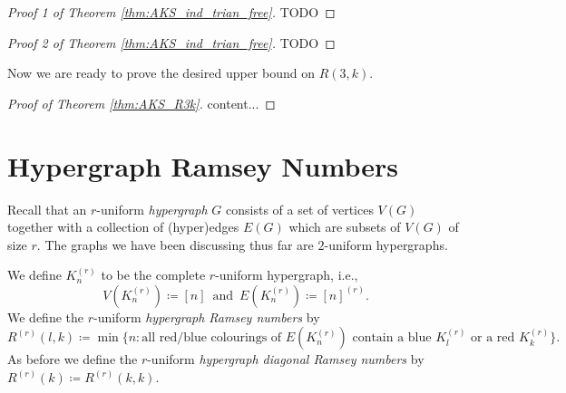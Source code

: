 \documentclass{report}
\theoremstyle{definition}
\theoremstyle{plain}
\theoremstyle{definition}
\begin{document}
	\begin{proof}[Proof 1 of Theorem \ref{thm:AKS_ind_trian_free}]
		{\color{red}TODO}
	\end{proof}
	\begin{proof}[Proof 2 of Theorem \ref{thm:AKS_ind_trian_free}]
		{\color{red}TODO}
	\end{proof}
	Now we are ready to prove the desired upper bound on $R(3,k)$.
	\begin{proof}[Proof of Theorem \ref{thm:AKS_R3k}]
		content...
	\end{proof}
	\chapter{Hypergraph Ramsey Numbers}
	Recall that an $r$-uniform \emph{hypergraph} $G$ consists of a set of vertices $V(G)$ together with a collection of (hyper)edges $E(G)$ which are subsets of $V(G)$ of size $r$. The graphs we have been discussing thus far are $2$-uniform hypergraphs. 
	
	We define $K_{n}^{(r)}$ to be the complete $r$-uniform hypergraph, i.e.,
	\[
		V(K_{n}^{(r)}) \coloneqq [n] \,\,\,\text{and}\,\,\, E(K_{n}^{(r)}) \coloneqq [n]^{(r)}.
	\]
	We define the $r$-uniform \emph{hypergraph Ramsey numbers} by
	\[
		R^{(r)}(l,k) \coloneqq \min \{n\colon \text{all red/blue colourings of $E(K_{n}^{(r)})$ contain a blue $K_l^{(r)}$ or a red $K_k^{(r)}$}\}.
	\]
	As before we define the $r$-uniform \emph{hypergraph diagonal Ramsey numbers} by $R^{(r)}(k)\coloneqq R^{(r)}(k,k)$.
\end{document}
